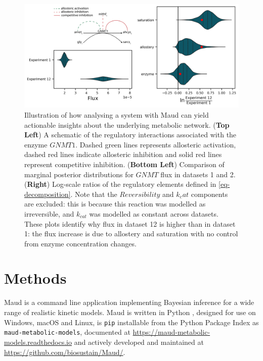 \documentclass[journal=asbcd6,manuscript=article,layout=traditional]{achemso}
\begin{document}
\begin{figure}

\begin{minipage}{\linewidth}

\includegraphics{./figures/decomposition.png}

\end{minipage}%

\caption{\label{fig-decomposition}Illustration of how analysing a system
with Maud can yield actionable insights about the underlying metabolic
network. (\textbf{Top Left}) A schematic of the regulatory interactions
associated with the enzyme \(GNMT1\). Dashed green lines represents
allosteric activation, dashed red lines indicate allosteric inhibition
and solid red lines represent competitive inhibition. (\textbf{Bottom
Left}) Comparison of marginal posterior distributions for \(GNMT\) flux
in datasets 1 and 2. (\textbf{Right}) Log-scale ratios of the regulatory
elements defined in \eqref{eq-decomposition}. Note that the
\(Reversibility\) and \(k_cat\) components are excluded: this is because
this reaction was modelled as irreversible, and \(k_{cat}\) was modelled
as constant across datasets. These plots identify why flux in dataset 12
is higher than in dataset 1: the flux increase is due to allostery and
saturation with no control from enzyme concentration changes.}

\end{figure}%

\section{Methods}\label{methods}

Maud is a command line application implementing Bayesian inference for a
wide range of realistic kinetic models. Maud is written in Python
\citep{vanrossumPythonReferenceManual2009}, designed for use on Windows,
macOS and Linux, is \texttt{pip} installable from the Python Package
Index as \texttt{maud-metabolic-models}, documented at
\url{https://maud-metabolic-models.readthedocs.io} and actively
developed and maintained at \url{https://github.com/biosustain/Maud/}.
\end{document}
